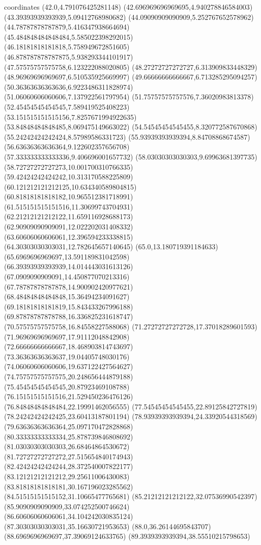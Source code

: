coordinates {%
(42.0,4.791076425281148)
(42.696969696969695,4.940278846584003)
(43.39393939393939,5.09412768980682)
(44.09090909090909,5.252767652578962)
(44.78787878787879,5.416347938664694)
(45.484848484848484,5.585022398292015)
(46.18181818181818,5.758949672851605)
(46.878787878787875,5.938293344101917)
(47.57575757575758,6.123222088020805)
(48.27272727272727,6.313909833448329)
(48.96969696969697,6.510535925669997)
(49.66666666666667,6.713285295094257)
(50.36363636363636,6.9223486311828974)
(51.06060606060606,7.137922561797954)
(51.75757575757576,7.36020983813378)
(52.45454545454545,7.589419525408223)
(53.151515151515156,7.8257671994922635)
(53.84848484848485,8.069475149663022)
(54.54545454545455,8.320772587670868)
(55.24242424242424,8.57989586331723)
(55.93939393939394,8.84708868674587)
(56.63636363636364,9.122602357656708)
(57.333333333333336,9.406696001657732)
(58.03030303030303,9.69963681397735)
(58.72727272727273,10.001700310766335)
(59.42424242424242,10.313170588225809)
(60.121212121212125,10.634340589804815)
(60.81818181818182,10.965512381718991)
(61.515151515151516,11.30699743704931)
(62.21212121212122,11.659116928688173)
(62.90909090909091,12.022202031408332)
(63.60606060606061,12.396594233338815)
(64.30303030303031,12.782645657140645)
(65.0,13.180719391184633)
(65.6969696969697,13.591189831042598)
(66.39393939393939,14.014443031613126)
(67.0909090909091,14.450877070213316)
(67.78787878787878,14.900902420977621)
(68.48484848484848,15.36494234091627)
(69.18181818181819,15.843433267996188)
(69.87878787878788,16.336825231618747)
(70.57575757575758,16.84558227588068)
(71.27272727272728,17.37018289601593)
(71.96969696969697,17.91112048842908)
(72.66666666666667,18.468903814743697)
(73.36363636363637,19.04405748030176)
(74.06060606060606,19.637122427564627)
(74.75757575757575,20.248656444879188)
(75.45454545454545,20.87923469108788)
(76.15151515151516,21.529450236476126)
(76.84848484848484,22.19991462056555)
(77.54545454545455,22.89125842727819)
(78.24242424242425,23.60413187801194)
(78.93939393939394,24.33920544318569)
(79.63636363636364,25.097170472828868)
(80.33333333333334,25.878739846808692)
(81.03030303030303,26.68464864530672)
(81.72727272727272,27.515654840174943)
(82.42424242424244,28.372540007822177)
(83.12121212121212,29.25611006430083)
(83.81818181818181,30.167196023285562)
(84.51515151515152,31.10665477765681)
(85.21212121212122,32.07536990542397)
(85.9090909090909,33.074252500746624)
(86.60606060606061,34.104242030835124)
(87.30303030303031,35.16630721953653)
(88.0,36.26144695843707)
(88.6969696969697,37.39069124633765)
(89.3939393939394,38.55510215798653)
}
